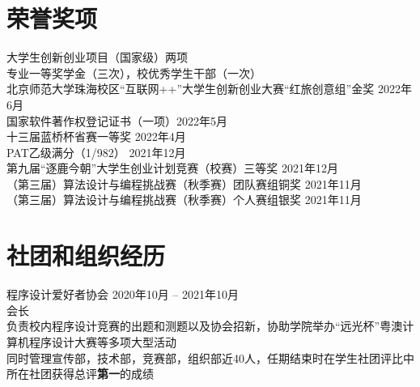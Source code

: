 \documentclass[a4paper,8pt]{article}
\begin{document}

\section{\textbf{荣誉奖项}}
\begin{apart}{3}{7}
    大学生创新创业项目（国家级）两项 \\
    专业一等奖学金（三次），校优秀学生干部（一次） \\
    北京师范大学珠海校区“互联网++”大学生创新创业大赛“红旅创意组”金奖 \hfill 2022年6月 \\
    国家软件著作权登记证书（一项）\hfill 2022年5月 \\
    十三届蓝桥杯省赛一等奖 \hfill 2022年4月 \\
    PAT乙级满分（1/982） \hfill 2021年12月 \\
    第九届“逐鹿今朝”大学生创业计划竞赛（校赛）三等奖 \hfill 2021年12月 \\
    （第三届）算法设计与编程挑战赛（秋季赛）团队赛组铜奖 \hfill 2021年11月 \\
    （第三届）算法设计与编程挑战赛（秋季赛）个人赛组银奖 \hfill 2021年11月
\end{apart}
\ignorespaces


\section{\textbf{社团和组织经历}}
\begin{apart}{3}{7}
    程序设计爱好者协会 \hfill 2020年10月 -- 2021年10月 \\
    会长 \\
    \textbullet 负责校内程序设计竞赛的出题和测题以及协会招新，协助学院举办“远光杯”粤澳计算机程序设计大赛等多项大型活动 \\
    \textbullet 同时管理宣传部，技术部，竞赛部，组织部近40人，任期结束时在学生社团评比中所在社团获得总评\textbf{第一}的成绩
\end{apart}
\ignorespaces

\end{document}
